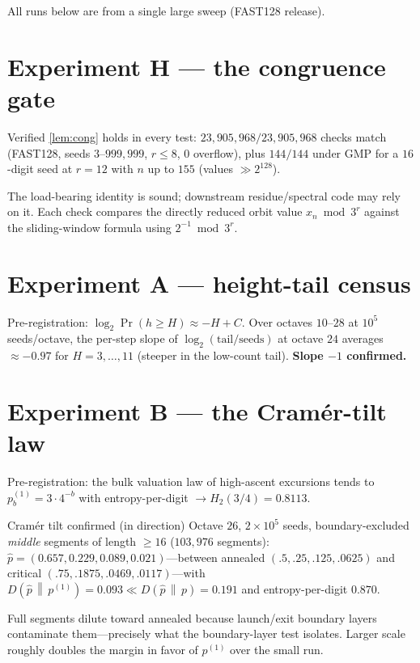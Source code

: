 \documentclass[11pt]{article}
\newcommand{\KL}[2]{D\!\left(#1\,\middle\|\,#2\right)}
\theoremstyle{plain}
\theoremstyle{remark}
\begin{document}
All runs below are from a single large sweep (\textsf{FAST128} release).

\section{Experiment H --- the congruence gate}

\begin{findingbox}{Verified}
\cref{lem:cong} holds in every test: \textbf{$23{,}905{,}968/23{,}905{,}968$}
checks match (\textsf{FAST128}, seeds $3$--$999{,}999$, $r\le8$, $0$ overflow),
plus \textbf{$144/144$} under \textsf{GMP} for a $16$-digit seed at $r=12$ with
$n$ up to $155$ (values $\gg 2^{128}$).
\end{findingbox}
\noindent The load-bearing identity is sound; downstream residue/spectral code may
rely on it. Each check compares the directly reduced orbit value $x_n\bmod 3^r$
against the sliding-window formula using $2^{-1}\bmod 3^r$.

\section{Experiment A --- height-tail census}

Pre-registration: $\log_2\Pr(h\ge H)\approx -H+C$. Over octaves $10$--$28$ at
$10^5$ seeds/octave, the per-step slope of $\log_2(\text{tail}/\text{seeds})$ at
octave $24$ averages $\approx\mathbf{-0.97}$ for $H=3,\dots,11$ (steeper in the
low-count tail). \textbf{Slope $-1$ confirmed.}

\section{Experiment B --- the Cram\'er-tilt law}

Pre-registration: the bulk valuation law of high-ascent excursions tends to
$p^{(1)}_b=3\cdot4^{-b}$ with entropy-per-digit $\to H_2(3/4)=0.8113$.

\begin{findingbox}{Cram\'er tilt confirmed (in direction)}
Octave $26$, $2\times10^5$ seeds, boundary-excluded \emph{middle} segments of
length $\ge16$ ($103{,}976$ segments):
$\hat p=(0.657,0.229,0.089,0.021)$---between annealed $(.5,.25,.125,.0625)$ and
critical $(.75,.1875,.0469,.0117)$---with
$\KL{\hat p}{p^{(1)}}=\mathbf{0.093}\ll\KL{\hat p}{p}=0.191$ and
entropy-per-digit $0.870$.
\end{findingbox}
\noindent Full segments dilute toward annealed because launch/exit boundary layers
contaminate them---precisely what the boundary-layer test isolates. Larger scale
roughly doubles the margin in favor of $p^{(1)}$ over the small run.
\end{document}

